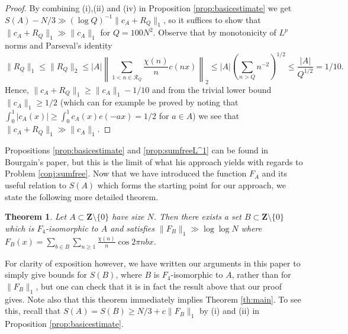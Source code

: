 \documentclass[11pt, reqno]{amsart}
\newtheorem{theorem}{Theorem}[section]
\begin{document}
\begin{proof}
   By combining (i),(ii) and (iv) in Proposition \ref{prop:basicestimate} we get $S(A)-N/3\gg (\log Q)^{-1}\lVert c_A+R_Q \rVert_1$, so it suffices to show that $\lVert c_A+R_Q\rVert_1\gg \lVert c_A\rVert_1$ for $Q=100N^2$. Observe that by monotonicity of $L^p$ norms and Parseval's identity $$\lVert R_Q\rVert_1\leqslant \lVert R_Q\rVert_2\leqslant |A|\left\lVert \sum_{1<n\in \mathcal{R}_Q}\frac{\chi(n)}{n}c( nx)\right\rVert_2\leqslant|A|\left(\sum_{n>Q} n^{-2}\right)^{1/2}\leqslant \frac{|A|}{Q^{1/2}}=1/10.$$
   Hence, $\lVert c_A+R_Q\rVert_1\geqslant \lVert c_A\rVert_1-1/10$ and from the trivial lower bound $\lVert c_A\rVert_1\geqslant 1/2$ (which can for example be proved by noting that $\int_0^1 |c_A(x)|\geqslant \int_0^1 c_A(x)e(-ax)=1/2$ for $a\in A$) we see that $\lVert c_A+R_Q\lVert_1\gg \lVert c_A\rVert_1$.
\end{proof}
Propositions \ref{prop:basicestimate} and \ref{prop:sumfreeL^1} can be found in Bourgain's paper, but this is the limit of what his approach yields with regards to Problem \ref{conj:sumfree}. Now that we have introduced the function $F_A$ and its useful relation to $S(A)$ which forms the starting point for our approach, we state the following more detailed theorem.
\begin{theorem}\label{th:mainL^1}
    Let $A\subset\mathbf{Z}\setminus\{0\}$ have size $N$. Then there exists a set $B\subset\mathbf{Z}\setminus\{0\}$ which is $F_4$-isomorphic to $A$ and satisfies $\lVert F_B\rVert_1\gg \log \log N$ where $F_B(x)=\sum_{b\in B}\sum_{n\geqslant 1}\frac{\chi(n)}{n}\cos 2\pi nbx$.
\end{theorem}
For clarity of exposition however, we have written our arguments in this paper to simply give bounds for $S(B)$, where $B$ is $F_4$-isomorphic to $A$, rather than for $\lVert F_B\rVert_1$, but one can check that it is in fact the result above that our proof gives.
Note also that this theorem immediately implies Theorem \ref{th:main}. To see this, recall that $S(A)=S(B)\geqslant N/3+c\lVert F_B\rVert_1$ by (i) and (ii) in Proposition \ref{prop:basicestimate}.
\end{document}
